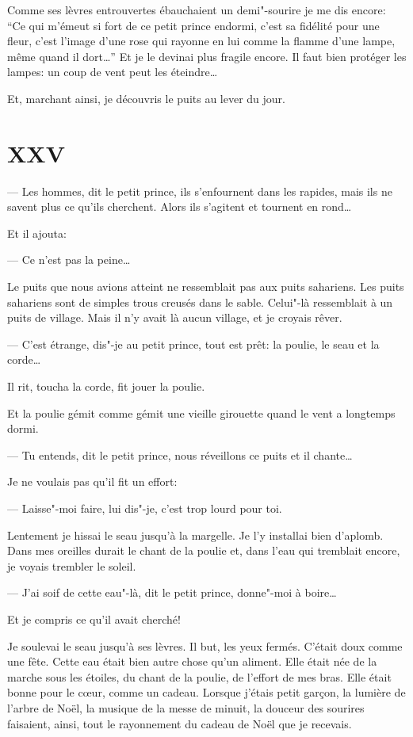 \begin{Parallel}[p]{}{}
{Comme ses lèvres entrouvertes ébauchaient un demi"-sourire je me dis encore: ``Ce qui
m'émeut si fort de ce petit prince endormi, c'est sa fidélité pour une fleur, c'est
l'image d’une rose qui rayonne en lui comme la flamme d'une lampe, même quand il
dort\ldots{}'' Et je le devinai plus fragile encore. Il faut bien protéger les lampes:
un coup de vent peut les éteindre\ldots{}

Et, marchant ainsi, je découvris le puits au lever du jour.

\section{XXV}
--- Les hommes, dit le petit prince, ils s'enfournent dans les rapides, mais ils ne
savent plus ce qu'ils cherchent. Alors ils s'agitent et tournent en rond\ldots{}

Et il ajouta:

--- Ce n'est pas la peine\ldots{}

Le puits que nous avions atteint ne ressemblait pas aux puits sahariens. Les puits
sahariens sont de simples trous creusés dans le sable. Celui"-là ressemblait à un
puits de village. Mais il n'y avait là aucun village, et je croyais rêver.

--- C'est étrange, dis"-je au petit prince, tout est prêt: la poulie, le seau et
la corde\ldots{}

Il rit, toucha la corde, fit jouer la poulie.

Et la poulie gémit comme gémit une vieille girouette quand le vent a longtemps dormi.

--- Tu entends, dit le petit prince, nous réveillons ce puits et il chante\ldots{}

Je ne voulais pas qu'il fit un effort:

--- Laisse"-moi faire, lui dis"-je, c'est trop lourd pour toi.

Lentement je hissai le seau jusqu'à la margelle. Je l'y installai bien d'aplomb.
Dans mes oreilles durait le chant de la poulie et, dans l'eau qui tremblait encore,
je voyais trembler le soleil.

--- J'ai soif de cette eau"-là, dit le petit prince, donne"-moi à boire\ldots{}

Et je compris ce qu'il avait cherché!

Je soulevai le seau jusqu'à ses lèvres. Il but, les yeux fermés. C'était doux comme
une fête. Cette eau était bien autre chose qu'un aliment. Elle était née de la marche
sous les étoiles, du chant de la poulie, de l'effort de mes bras. Elle était bonne
pour le cœur, comme un cadeau. Lorsque j'étais petit garçon, la lumière de l'arbre
de Noël, la musique de la messe de minuit, la douceur des sourires faisaient, ainsi,
tout le rayonnement du cadeau de Noël que je recevais.

}
\end{Parallel}
